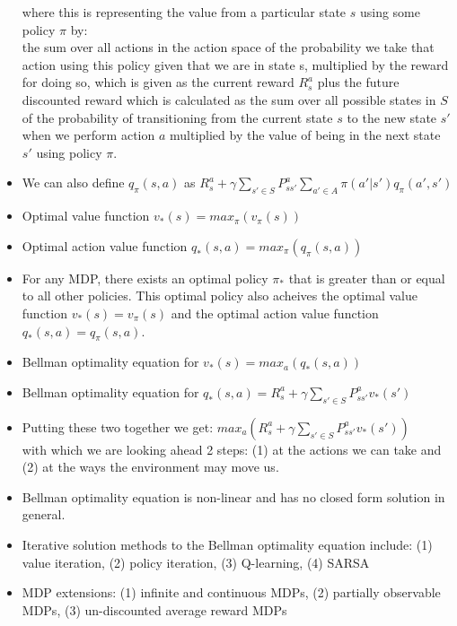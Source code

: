 \documentclass[12pt]{article}
\begin{document}
\begin{itemize}
    where this is representing the value from a particular state $s$ using some policy $\pi$ by: \\
    the sum over all actions in the action space of the probability we take that action using this policy
    given that we are in state s, multiplied by the reward for doing so, which is given as the current
    reward $R_s^a$ plus the future discounted reward which is calculated as the sum over all possible states
    in $S$ of the probability of transitioning from the current state $s$ to the new state $s'$ when we perform
    action $a$ multiplied by the value of being in the next state $s'$ using policy $\pi$.
    \item We can also define $q_\pi(s,a)$ as $R_s^a + \gamma \sum_{s' \in S}P_{ss'}^a \sum_{a' \in A} \pi(a' | s')q_\pi(a', s')$
    \item Optimal value function $v_*(s) = max_\pi(v_\pi(s))$
    \item Optimal action value function $q_*(s, a) = max_\pi(q_\pi(s, a))$
    \item For any MDP, there exists an optimal policy $\pi_*$ that is greater than or equal to all other policies. This optimal policy
    also acheives the optimal value function $v_*(s) = v_\pi(s)$ and the optimal action value function $q_*(s,a) = q_\pi(s,a)$.
    \item Bellman optimality equation for $v_*(s) = max_a(q_*(s, a))$
    \item Bellman optimality equation for $q_*(s, a) = R_s^a + \gamma \sum_{s' \in S}P_{ss'}^a v_*(s')$
    \item Putting these two together we get: $max_a(R_s^a + \gamma \sum_{s' \in S}P_{ss'}^a v_*(s'))$\\
    with which we are looking ahead 2 steps: (1) at the actions we can take and (2) at the ways the environment may move us.
    \item Bellman optimality equation is non-linear and has no closed form solution in general.
    \item Iterative solution methods to the Bellman optimality equation include: (1) value iteration, (2) policy iteration,
    (3) Q-learning, (4) SARSA
    \item MDP extensions: (1) infinite and continuous MDPs, (2) partially observable MDPs, (3) un-discounted average reward MDPs
  \end{itemize}
\end{document}
